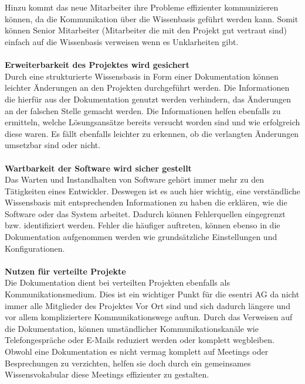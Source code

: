 \documentclass[a4paper,12pt,twoside]{scrartcl}
\begin{document}
\\\\
Hinzu kommt das neue Mitarbeiter ihre Probleme effizienter kommunizieren können, da die Kommunikation über die Wissenbasis geführt werden kann. Somit können Senior Mitarbeiter (Mitarbeiter die mit den Projekt gut vertraut sind) einfach auf die Wissenbasis verweisen wenn es Unklarheiten gibt. 
\\\\
\textbf{Erweiterbarkeit des Projektes wird gesichert}\\
Durch eine strukturierte Wissensbasis in Form einer Dokumentation können leichter Änderungen an den Projekten durchgeführt werden. Die Informationen die hierfür aus der Dokumentation genutzt werden verhindern, das Änderungen an der falschen Stelle gemacht werden. Die Informationen helfen ebenfalls zu ermitteln, welche Lösungsansätze bereits versucht worden sind und wie erfolgreich diese waren. Es fällt ebenfalls leichter zu erkennen, ob die verlangten Änderungen umsetzbar sind oder nicht.
\\\\
\textbf{Wartbarkeit der Software wird sicher gestellt}\\
Das Warten und Instandhalten von Software gehört immer mehr zu den Tätigkeiten eines Entwickler. Deswegen ist es auch hier wichtig, eine verständliche Wissensbasis mit entsprechenden Informationen zu haben die erklären, wie die Software oder das System arbeitet. Dadurch können Fehlerquellen eingegrenzt bzw. identifiziert werden. Fehler die häufiger auftreten, können ebenso in die Dokumentation aufgenommen werden wie grundsätzliche Einstellungen und Konfigurationen.
\\\\
\textbf{Nutzen für verteilte Projekte}\\
Die Dokumentation dient bei verteilten Projekten ebenfalls als Kommunikationsmedium. Dies ist ein wichtiger Punkt für die esentri AG da nicht immer alle Mitglieder des Projektes Vor Ort sind und sich dadurch längere und vor allem kompliziertere Kommunikationswege auftun. Durch das Verweisen auf die Dokumentation, können umständlicher Kommunikationskanäle wie Telefongespräche oder E-Mails reduziert werden oder komplett wegbleiben. Obwohl eine Dokumentation es nicht vermag komplett auf Meetings oder Besprechungen zu verzichten, helfen sie doch durch ein gemeinsames Wissensvokabular diese Meetings effizienter zu gestalten. 
\end{document}
